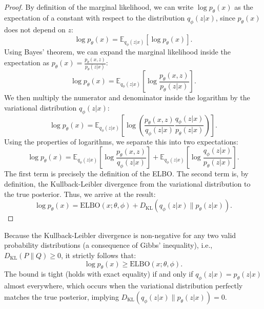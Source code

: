 \begin{proof}
By definition of the marginal likelihood, we can write $\log p_\theta(x)$ as the expectation of a constant with respect to the distribution $q_\phi(z|x)$, since $p_\theta(x)$ does not depend on $z$:
\begin{equation}
    \log p_\theta(x) = \mathbb{E}_{q_\phi(z|x)}[ \log p_\theta(x) ].
\end{equation}
Using Bayes' theorem, we can expand the marginal likelihood inside the expectation as $p_\theta(x) = \frac{p_\theta(x, z)}{p_\theta(z|x)}$:
\begin{equation}
    \log p_\theta(x) = \mathbb{E}_{q_\phi(z|x)}\left[ \log \frac{p_\theta(x, z)}{p_\theta(z|x)} \right].
\end{equation}
We then multiply the numerator and denominator inside the logarithm by the variational distribution $q_\phi(z|x)$:
\begin{equation}
    \log p_\theta(x) = \mathbb{E}_{q_\phi(z|x)}\left[ \log \left( \frac{p_\theta(x, z)}{q_\phi(z|x)} \frac{q_\phi(z|x)}{p_\theta(z|x)} \right) \right].
\end{equation}
Using the properties of logarithms, we separate this into two expectations:
\begin{equation}
    \log p_\theta(x) = \mathbb{E}_{q_\phi(z|x)}\left[ \log \frac{p_\theta(x, z)}{q_\phi(z|x)} \right] + \mathbb{E}_{q_\phi(z|x)}\left[ \log \frac{q_\phi(z|x)}{p_\theta(z|x)} \right].
\end{equation}
The first term is precisely the definition of the ELBO. The second term is, by definition, the Kullback-Leibler divergence from the variational distribution to the true posterior. Thus, we arrive at the result:
\begin{equation}
    \log p_\theta(x) = \mathrm{ELBO}(x; \theta, \phi) + D_{\mathrm{KL}}(q_\phi(z|x) \parallel p_\theta(z|x)).
\end{equation}
\end{proof}

\begin{corollary}
Because the Kullback-Leibler divergence is non-negative for any two valid probability distributions (a consequence of Gibbs' inequality), i.e., $D_{\mathrm{KL}}(P \parallel Q) \geq 0$, it strictly follows that:
\begin{equation}
    \log p_\theta(x) \geq \mathrm{ELBO}(x; \theta, \phi).
\end{equation}
The bound is tight (holds with exact equality) if and only if $q_\phi(z|x) = p_\theta(z|x)$ almost everywhere, which occurs when the variational distribution perfectly matches the true posterior, implying $D_{\mathrm{KL}}(q_\phi(z|x) \parallel p_\theta(z|x)) = 0$.
\end{corollary}


